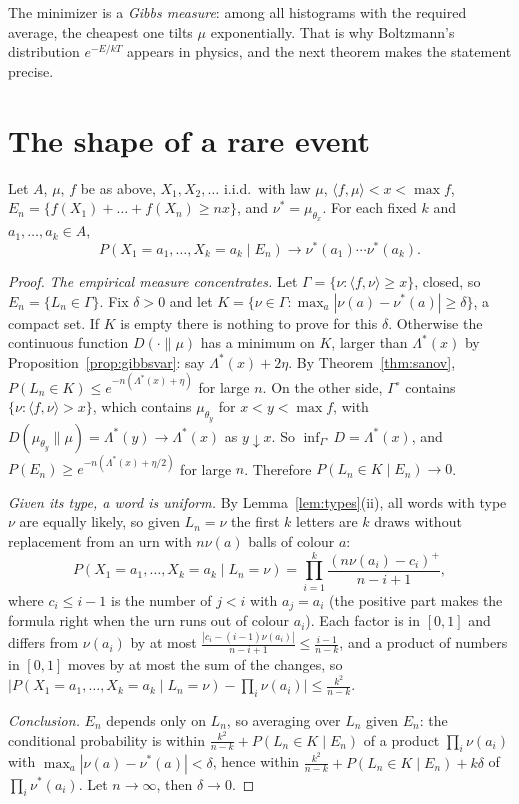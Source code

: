 The minimizer is a \emph{Gibbs measure}: among all histograms with the required average, the cheapest one tilts $\mu$ exponentially. That is why Boltzmann's distribution
$e^{-E/kT}$ appears in physics, and the next theorem makes the statement precise.

\section{The shape of a rare event}

\begin{theorem}\label{thm:gibbscond}
Let $A$, $\mu$, $f$ be as above, $X_1,X_2,\dots$ i.i.d.\ with law $\mu$, $\langle f,\mu\rangle<x<\max f$, $E_n=\{f(X_1)+\dots+f(X_n)\ge nx\}$, and $\nu^*=\mu_{\theta_x}$. For each fixed $k$
and $a_1,\dots,a_k\in A$,
\[
P(X_1=a_1,\dots,X_k=a_k\mid E_n)\longrightarrow\nu^*(a_1)\cdots\nu^*(a_k).
\]
\end{theorem}
\begin{proof}
\emph{The empirical measure concentrates.} Let $\Gamma=\{\nu:\langle f,\nu\rangle\ge x\}$, closed, so $E_n=\{L_n\in\Gamma\}$. Fix $\delta>0$ and let $K=\{\nu\in\Gamma:\max_a|\nu(a)-\nu^*(a)|\ge\delta\}$, a compact set. If $K$ is empty there is nothing to prove for this $\delta$. Otherwise the continuous function $D(\cdot\|\mu)$ has a minimum on $K$, larger than $\Lambda^*(x)$ by Proposition~\ref{prop:gibbsvar}: say $\Lambda^*(x)+2\eta$. By Theorem~\ref{thm:sanov},
$P(L_n\in K)\le e^{-n(\Lambda^*(x)+\eta)}$ for large $n$. On the other side, $\Gamma^\circ$ contains $\{\nu:\langle f,\nu\rangle>x\}$, which contains $\mu_{\theta_y}$ for $x<y<\max f$, with
$D(\mu_{\theta_y}\|\mu)=\Lambda^*(y)\to\Lambda^*(x)$ as $y\downarrow x$. So $\inf_{\Gamma^\circ}D=\Lambda^*(x)$, and $P(E_n)\ge e^{-n(\Lambda^*(x)+\eta/2)}$ for large $n$. Therefore
$P(L_n\in K\mid E_n)\to0$.

\emph{Given its type, a word is uniform.} By Lemma~\ref{lem:types}(ii), all words with type $\nu$ are equally likely, so given $L_n=\nu$ the first $k$ letters are $k$ draws without
replacement from an urn with $n\nu(a)$ balls of colour $a$:
\[
P(X_1=a_1,\dots,X_k=a_k\mid L_n=\nu)=\prod_{i=1}^k\frac{(n\nu(a_i)-c_i)^+}{n-i+1},
\]
where $c_i\le i-1$ is the number of $j<i$ with $a_j=a_i$ (the positive part makes the formula right when the urn runs out of colour $a_i$). Each factor is in $[0,1]$
and differs from $\nu(a_i)$ by at most $\frac{|c_i-(i-1)\nu(a_i)|}{n-i+1}\le\frac{i-1}{n-k}$, and a product of numbers in $[0,1]$ moves by at most the sum of the changes, so
$\bigl|P(X_1=a_1,\dots,X_k=a_k\mid L_n=\nu)-\prod_i\nu(a_i)\bigr|\le\frac{k^2}{n-k}$.

\emph{Conclusion.} $E_n$ depends only on $L_n$, so averaging over $L_n$ given $E_n$: the conditional probability is within $\frac{k^2}{n-k}+P(L_n\in K\mid E_n)$ of a product
$\prod_i\nu(a_i)$ with $\max_a|\nu(a)-\nu^*(a)|<\delta$, hence within $\frac{k^2}{n-k}+P(L_n\in K\mid E_n)+k\delta$ of $\prod_i\nu^*(a_i)$. Let $n\to\infty$, then $\delta\to0$.
\end{proof}


